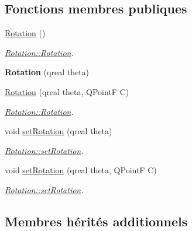 \subsection*{Fonctions membres publiques}
\begin{DoxyCompactItemize}
\item 
\hypertarget{class_rotation_a13ea1d345ca0a92c0f09b4de544ca460}{}\hyperlink{class_rotation_a13ea1d345ca0a92c0f09b4de544ca460}{Rotation} ()\label{class_rotation_a13ea1d345ca0a92c0f09b4de544ca460}

\begin{DoxyCompactList}\small\item\em \hyperlink{class_rotation_a13ea1d345ca0a92c0f09b4de544ca460}{Rotation\+::\+Rotation}. \end{DoxyCompactList}\item 
\hypertarget{class_rotation_a4939b65ee4d8cc83269eb668fc6aed40}{}{\bfseries Rotation} (qreal theta)\label{class_rotation_a4939b65ee4d8cc83269eb668fc6aed40}

\item 
\hyperlink{class_rotation_abfceda7f8e104a03351262fdf4c5356d}{Rotation} (qreal theta, Q\+Point\+F C)
\begin{DoxyCompactList}\small\item\em \hyperlink{class_rotation_a13ea1d345ca0a92c0f09b4de544ca460}{Rotation\+::\+Rotation}. \end{DoxyCompactList}\item 
void \hyperlink{class_rotation_ae4e808253ede637d1894f769778cd3cb}{set\+Rotation} (qreal theta)
\begin{DoxyCompactList}\small\item\em \hyperlink{class_rotation_ae4e808253ede637d1894f769778cd3cb}{Rotation\+::set\+Rotation}. \end{DoxyCompactList}\item 
void \hyperlink{class_rotation_aab9fbeda6f4a74f01d2418d232fbce44}{set\+Rotation} (qreal theta, Q\+Point\+F C)
\begin{DoxyCompactList}\small\item\em \hyperlink{class_rotation_ae4e808253ede637d1894f769778cd3cb}{Rotation\+::set\+Rotation}. \end{DoxyCompactList}\end{DoxyCompactItemize}
\subsection*{Membres hérités additionnels}


